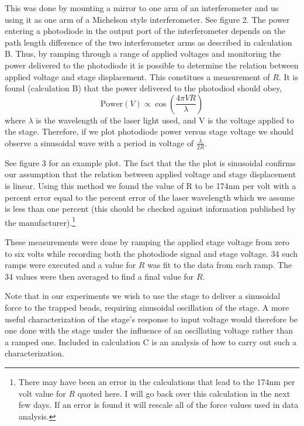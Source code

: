 \documentclass{report}
\begin{document}
This was done by mounting a mirror to one arm of an interferometer and us using it as one arm of a Michelson style interferometer. See figure 2. The power entering a photodiode in the output port of the interferometer depends on the path length difference of the two interferometer arms as described in calculation B. Thus, by ramping through a range of applied voltages and monitoring the power delivered to the photodiode it is possible to determine the relation between applied voltage and stage displacement. This constitues a measurement of $R$. It is found (calculation B) that the power delivered to the photodiod should obey,
\begin{displaymath}
\textrm{Power}(V) \propto \cos(\frac{4\pi VR}{\lambda})
\end{displaymath}
where $\lambda$ is the wavelength of the laser light used, and V is the voltage applied to the stage. Therefore, if we plot photodiode power versus stage voltage we should observe a sinusoidal wave with a period in voltage of $\frac{\lambda}{2R}$.

See figure 3 for an example plot. The fact that the the plot is sinusoidal confirms our assumption that the relation between applied voltage and stage displacement is linear. Using this method we found the value of R to be 174nm per volt with a percent error equal to the percent error of the laser wavelength which we assume is less than one percent (this should be checked against information published by the manufacturer).\footnote{There may have been an error in the calculations that lead to the 174nm per volt value for $R$ quoted here. I will go back over this calculation in the next few days. If an error is found it will rescale all of the force values used in data analysis.}

These measurements were done by ramping the applied stage voltage from zero to six volts while recording both the photodiode signal and stage voltage. 34 such ramps were executed and a value for $R$ was fit to the data from each ramp. The 34 values were then averaged to find a final value for $R$.

Note that in our experiments we wish to use the stage to deliver a sinusoidal force to the trapped beads, requiring sinusoidal oscillation of the stage. A more useful characterization of the stage's response to input voltage would therefore be one done with the stage under the influence of an oscillating voltage rather than a ramped one. Included in calculation C is an analysis of how to carry out such a characterization.
\end{document}
